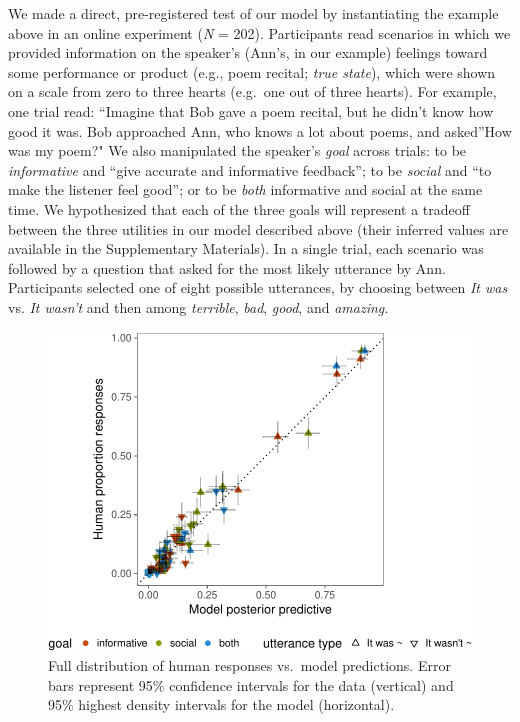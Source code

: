 \documentclass[floatsintext,man]{apa6}
\theoremstyle{definition}
\theoremstyle{definition}
\theoremstyle{definition}
\theoremstyle{remark}
\begin{document}
We made a direct, pre-registered test of our model by instantiating the
example above in an online experiment (\emph{N} = 202). Participants
read scenarios in which we provided information on the speaker's (Ann's,
in our example) feelings toward some performance or product (e.g., poem
recital; \emph{true state}), which were shown on a scale from zero to
three hearts (e.g.~one out of three hearts). For example, one trial
read: \enquote{Imagine that Bob gave a poem recital, but he didn't know
how good it was. Bob approached Ann, who knows a lot about poems, and
asked}How was my poem?" We also manipulated the speaker's \emph{goal}
across trials: to be \emph{informative} and \enquote{give accurate and
informative feedback}; to be \emph{social} and \enquote{to make the
listener feel good}; or to be \emph{both} informative and social at the
same time. We hypothesized that each of the three goals will represent a
tradeoff between the three utilities in our model described above (their
inferred values are available in the Supplementary Materials). In a
single trial, each scenario was followed by a question that asked for
the most likely utterance by Ann. Participants selected one of eight
possible utterances, by choosing between \emph{It was} vs. \emph{It
wasn't} and then among \emph{terrible}, \emph{bad}, \emph{good}, and
\emph{amazing.}

\begin{figure}
\centering
\includegraphics{polite_manuscript_files/figure-latex/variance-1.pdf}
\caption{\label{fig:variance}Full distribution of human responses vs.~model
predictions. Error bars represent 95\% confidence intervals for the data
(vertical) and 95\% highest density intervals for the model
(horizontal).}
\end{figure}
\end{document}
